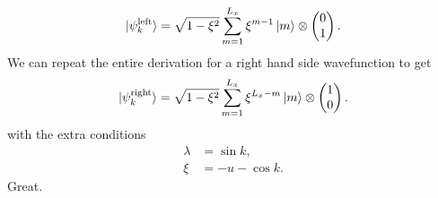 \begin{align}
    \ket{\psi^{\textup{left}}_k} = \sqrt{1-\xi^2}\sum_{m=1}^{L_x} \xi^{m-1}\ket m \otimes \begin{pmatrix}
    0\\
    1
    \end{pmatrix}.
\end{align}
We can repeat the entire derivation for a right hand side wavefunction to get
\begin{align}
    \ket {\psi^{\textup{right}}_k} = \sqrt{1-\xi^2} \sum_{m=1}^{L_x} \xi^{L_x-m} \ket m \otimes  \begin{pmatrix}
    1\\
    0
    \end{pmatrix}.
\end{align}
with the extra conditions
\begin{align}
    \lambda &= \sin k,\\
    \xi &= -u-\cos k. \label{eqn:edge_condition}
\end{align}
Great.

